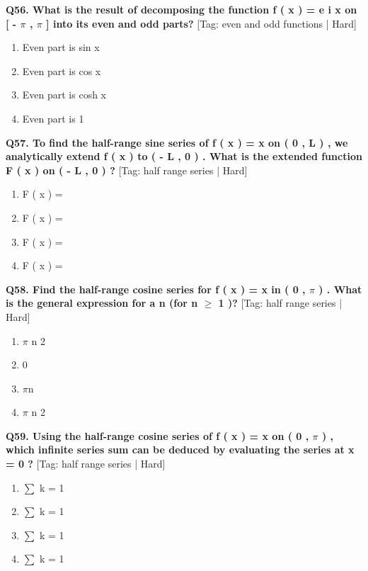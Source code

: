 \noindent\textbf{Q56. What is the result of decomposing the function f ( x ) = e i x on [ - $\pi$ , $\pi$ ] into its even and odd parts?} \hfill [Tag: even and odd functions | Hard]
\begin{enumerate}[label=(\alph*),topsep=2pt,itemsep=1pt,partopsep=0pt,parsep=0pt]
    \item {{Even part is sin x}}
    \item {{Even part is cos x}}
    \item {{Even part is cosh x}}
    \item {{Even part is 1}}
\end{enumerate}
\vspace{2mm}

\noindent\textbf{Q57. To find the half-range sine series of f ( x ) = x on ( 0 , L ) , we analytically extend f ( x ) to ( - L , 0 ) . What is the extended function F ( x ) on ( - L , 0 ) ?} \hfill [Tag: half range series | Hard]
\begin{enumerate}[label=(\alph*),topsep=2pt,itemsep=1pt,partopsep=0pt,parsep=0pt]
    \item {{F ( x ) =}}
    \item {{F ( x ) =}}
    \item {{F ( x ) =}}
    \item {{F ( x ) =}}
\end{enumerate}
\vspace{2mm}

\noindent\textbf{Q58. Find the half-range cosine series for f ( x ) = x in ( 0 , $\pi$ ) . What is the general expression for a n (for n $\ge$ 1 )?} \hfill [Tag: half range series | Hard]
\begin{enumerate}[label=(\alph*),topsep=2pt,itemsep=1pt,partopsep=0pt,parsep=0pt]
    \item {{$\pi$ n 2}}
    \item {{0}}
    \item {{$\pi$n}}
    \item {{$\pi$ n 2}}
\end{enumerate}
\vspace{2mm}

\noindent\textbf{Q59. Using the half-range cosine series of f ( x ) = x on ( 0 , $\pi$ ) , which infinite series sum can be deduced by evaluating the series at x = 0 ?} \hfill [Tag: half range series | Hard]
\begin{enumerate}[label=(\alph*),topsep=2pt,itemsep=1pt,partopsep=0pt,parsep=0pt]
    \item {{$\sum$ k = 1}}
    \item {{$\sum$ k = 1}}
    \item {{$\sum$ k = 1}}
    \item {{$\sum$ k = 1}}
\end{enumerate}
\vspace{2mm}

